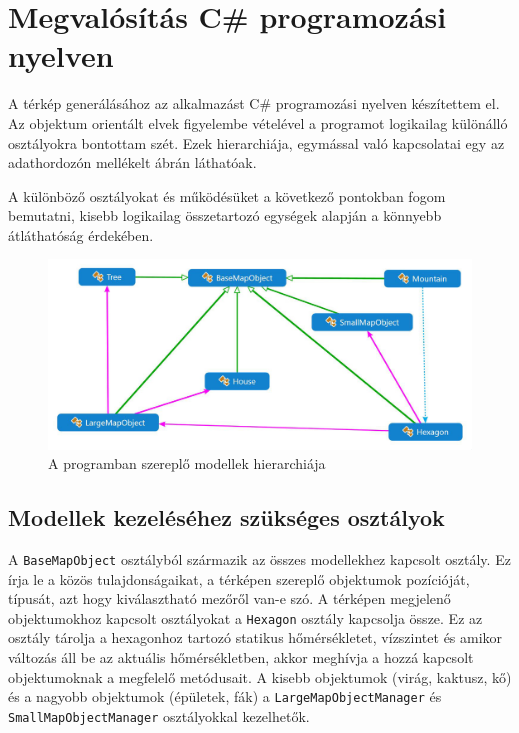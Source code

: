 \chapter{Megvalósítás C\# programozási nyelven}

A térkép generálásához az alkalmazást C\# programozási nyelven készítettem el. Az objektum orientált elvek figyelembe vételével a programot logikailag különálló osztályokra bontottam szét. Ezek hierarchiája, egymással való kapcsolatai egy az adathordozón mellékelt ábrán láthatóak.

A különböző osztályokat és működésüket a következő pontokban fogom bemutatni, kisebb logikailag összetartozó egységek alapján a könnyebb átláthatóság érdekében.

\begin{figure}[h!]
\centering
\includegraphics[scale=0.3]{kepek/White_modellek.JPG}
\caption{A programban szereplő modellek hierarchiája}
\label{fig:modellek}
\end{figure}

\section{Modellek kezeléséhez szükséges osztályok}

A \texttt{BaseMapObject} osztályból származik az összes modellekhez kapcsolt osztály. Ez írja le a közös tulajdonságaikat, a térképen szereplő objektumok pozícióját, típusát, azt hogy kiválasztható mezőről van-e szó. A térképen megjelenő objektumokhoz kapcsolt osztályokat a \texttt{Hexagon} osztály kapcsolja össze. Ez az osztály tárolja  a hexagonhoz tartozó statikus hőmérsékletet, vízszintet és amikor változás áll be az aktuális hőmérsékletben, akkor meghívja a hozzá kapcsolt objektumoknak a megfelelő metódusait. A kisebb objektumok (virág, kaktusz, kő) és a nagyobb objektumok (épületek, fák) a \texttt{LargeMapObjectManager} és \texttt{SmallMapObjectManager} osztályokkal kezelhetők.

